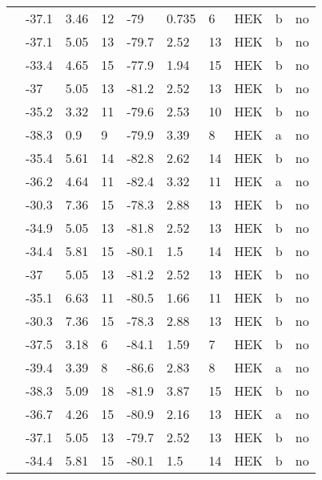 \begin{longtable}{p{5cm}|lll|lll|lll}
\citet{Kapplinger2015MutationDB} & -37.1 & 3.46 & 12 & -79 & 0.735 & 6 & HEK & b & no \\
\citet{Kapplinger2015MutationDB} & -37.1 & 5.05 & 13 & -79.7 & 2.52 & 13 & HEK & b & no \\
\citet{Kapplinger2015MutationDB} & -33.4 & 4.65 & 15 & -77.9 & 1.94 & 15 & HEK & b & no \\
\citet{Kapplinger2015MutationDB} & -37 & 5.05 & 13 & -81.2 & 2.52 & 13 & HEK & b & no \\
\citet{Kapplinger2015MutationDB} & -35.2 & 3.32 & 11 & -79.6 & 2.53 & 10 & HEK & b & no \\
\citet{Kapplinger2015MutationDB} & -38.3 & 0.9 & 9 & -79.9 & 3.39 & 8 & HEK & a & no \\
\citet{Kapplinger2015MutationDB} & -35.4 & 5.61 & 14 & -82.8 & 2.62 & 14 & HEK & b & no \\
\citet{Kapplinger2015MutationDB} & -36.2 & 4.64 & 11 & -82.4 & 3.32 & 11 & HEK & a & no \\
\citet{Kapplinger2015MutationDB} & -30.3 & 7.36 & 15 & -78.3 & 2.88 & 13 & HEK & b & no \\
\citet{Kapplinger2015MutationDB} & -34.9 & 5.05 & 13 & -81.8 & 2.52 & 13 & HEK & b & no \\
\citet{Kapplinger2015MutationDB} & -34.4 & 5.81 & 15 & -80.1 & 1.5 & 14 & HEK & b & no \\
\citet{Kapplinger2015MutationDB} & -37 & 5.05 & 13 & -81.2 & 2.52 & 13 & HEK & b & no \\
\citet{Kapplinger2015MutationDB} & -35.1 & 6.63 & 11 & -80.5 & 1.66 & 11 & HEK & b & no \\
\citet{Kapplinger2015MutationDB} & -30.3 & 7.36 & 15 & -78.3 & 2.88 & 13 & HEK & b & no \\
\citet{Kapplinger2015MutationDB} & -37.5 & 3.18 & 6 & -84.1 & 1.59 & 7 & HEK & b & no \\
\citet{Kapplinger2015MutationDB} & -39.4 & 3.39 & 8 & -86.6 & 2.83 & 8 & HEK & a & no \\
\citet{Kapplinger2015MutationDB} & -38.3 & 5.09 & 18 & -81.9 & 3.87 & 15 & HEK & b & no \\
\citet{Kapplinger2015MutationDB} & -36.7 & 4.26 & 15 & -80.9 & 2.16 & 13 & HEK & a & no \\
\citet{Kapplinger2015MutationDB} & -37.1 & 5.05 & 13 & -79.7 & 2.52 & 13 & HEK & b & no \\
\citet{Kapplinger2015MutationDB} & -34.4 & 5.81 & 15 & -80.1 & 1.5 & 14 & HEK & b & no \\

\end{longtable}

